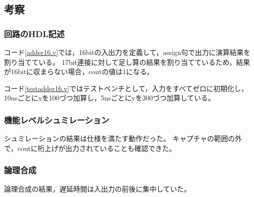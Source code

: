 \subsection{考察}
\subsubsection{回路のHDL記述}
コード\ref{adder16.v}では，16bitの入出力を定義して，assign句で出力に演算結果を割り当てている。
17bit連接に対して足し算の結果を割り当てているため，結果が16bitに収まらない場合，coutの値は1になる。

コード\ref{testadder16.v}ではテストベンチとして，入力をすべてゼロに初期化し，10nsごとにxを100づつ加算し，5nsごとにyを300づつ加算している。

\subsubsection{機能レベルシュミレーション}
シュミレーションの結果は仕様を満たす動作だった。
キャプチャの範囲の外で，coutに桁上げが出力されていることも確認できた。

\subsubsection{論理合成}
論理合成の結果，遅延時間は入出力の前後に集中していた。
